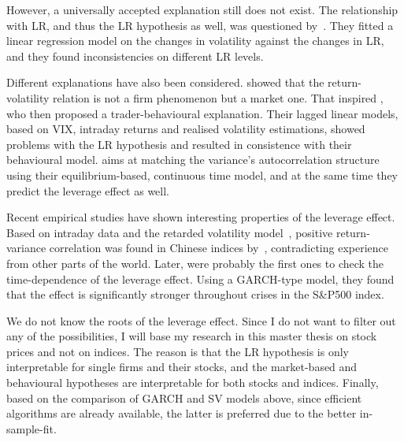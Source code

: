 However, a universally accepted explanation still does not exist.
The relationship with LR, and thus the LR hypothesis as well, was questioned by~\citet{figlewski2000leverage}.
They fitted a linear regression model on the changes in volatility against the changes in LR, and they found inconsistencies on different LR levels.

Different explanations have also been considered. \citet{dennis2006stock} showed that the return-volatility relation is not a firm phenomenon but a market one.
That inspired \citet{Hibbert2008}, who then proposed a trader-behavioural explanation.
Their lagged linear models, based on VIX, intraday returns and realised volatility estimations, showed problems with the LR hypothesis and resulted in consistence with their behavioural model.
\citet{bollerslev2011volatility} aims at matching the variance's autocorrelation structure using their equilibrium-based, continuous time model, and at the same time they predict the leverage effect as well.

Recent empirical studies have shown interesting properties of the leverage effect.
Based on intraday data and the retarded volatility model~\citep{Bouchaud2001}, positive return-variance correlation was found in Chinese indices by~\citet{Shen2009}, contradicting experience from other parts of the world.
Later, \citet{Christensen2015} were probably the first ones to check the time-dependence of the leverage effect.
Using a GARCH-type model, they found that the effect is significantly stronger throughout crises in the S\&P500 index.

We do not know the roots of the leverage effect.
Since I do not want to filter out any of the possibilities, I will base my research in this master thesis on stock prices and not on indices.
The reason is that the LR hypothesis is only interpretable for single firms and their stocks, and the market-based and behavioural hypotheses are interpretable for both stocks and indices.
Finally, based on the comparison of GARCH and SV models above, since efficient algorithms are already available, the latter is preferred due to the better in-sample-fit.

